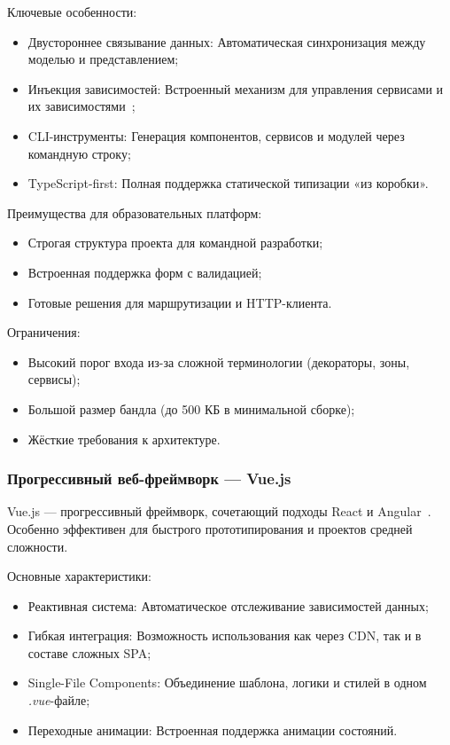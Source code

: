 Ключевые особенности:
\begin{itemize}
  \item Двустороннее связывание данных: Автоматическая синхронизация между моделью и представлением;
  \item Инъекция зависимостей: Встроенный механизм для управления сервисами и их зависимостями~\cite{angular_dependency_injection};
  \item CLI-инструменты: Генерация компонентов, сервисов и модулей через командную строку;
  \item TypeScript-first: Полная поддержка статической типизации «из коробки».
\end{itemize}

Преимущества для образовательных платформ:
\begin{itemize}
  \item Строгая структура проекта для командной разработки;
  \item Встроенная поддержка форм с валидацией;
  \item Готовые решения для маршрутизации и HTTP-клиента.
\end{itemize}

Ограничения:
\begin{itemize}
  \item Высокий порог входа из-за сложной терминологии (декораторы, зоны, сервисы);
  \item Большой размер бандла (до 500 КБ в минимальной сборке);
  \item Жёсткие требования к архитектуре.
\end{itemize}

\subsubsection{Прогрессивный веб-фреймворк — Vue.js}
Vue.js — прогрессивный фреймворк, сочетающий подходы React и Angular~\cite{vuejs_guide}. Особенно эффективен для быстрого прототипирования и проектов средней сложности.

Основные характеристики:
\begin{itemize}
  \item Реактивная система: Автоматическое отслеживание зависимостей данных;
  \item Гибкая интеграция: Возможность использования как через CDN, так и в составе сложных SPA;
  \item Single-File Components: Объединение шаблона, логики и стилей в одном \textit{.vue}-файле;
  \item Переходные анимации: Встроенная поддержка анимации состояний.
\end{itemize}

